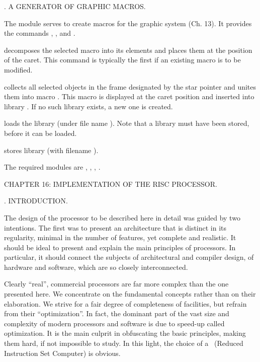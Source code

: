 . A GENERATOR OF GRAPHIC MACROS.

The module  serves to create macros for the graphic system (Ch. 13). It provides the commands , ,  and .

 decomposes the selected macro into its elements and places them at the position of the caret. This command is typically the first if an existing macro is to be modified.

 collects all selected objects in the frame designated by the star pointer and unites them into macro . This macro is displayed at the caret position and inserted into library . If no such library exists, a new one is created.

 loads the library  (under file name ). Note that a library must have been stored, before it can be loaded.

 stores library  (with filename ).

The required modules are , , , .

\beginchapter CHAPTER 16: IMPLEMENTATION OF THE RISC PROCESSOR.

. INTRODUCTION.

The design of the processor to be described here in detail was guided by two intentions. The first was to present an architecture that is distinct in its regularity, minimal in the number of features, yet complete and realistic. It should be ideal to present and explain the main principles of processors. In particular, it should connect the subjects of architectural and compiler design, of hardware and software, which are so closely interconnected.

Clearly ``real'', commercial processors are far more complex than the one presented here. We concentrate on the fundamental concepts rather than on their elaboration. We strive for a fair degree of completeness of facilities, but refrain from their ``optimization''. In fact, the dominant part of the vast size and complexity of modern processors and software is due to speed-up called optimization. It is the main culprit in obfuscating the basic principles, making them hard, if not impossible to study. In this light, the choice of a \RISC\ (Reduced Instruction Set Computer) is obvious.

